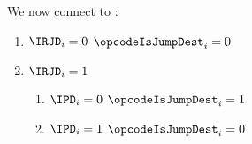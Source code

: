 We now connect \opcodeIsJumpDest{} to \IRJD{}:
\begin{enumerate}
    \item \If $\IRJD _{i} = 0$ \Then $\opcodeIsJumpDest _{i} = 0$
    \item \If $\IRJD _{i} = 1$ \Then
        \begin{enumerate}
            \item \If $\IPD _{i} = 0$ \Then $\opcodeIsJumpDest _{i} = 1$
            \item \If $\IPD _{i} = 1$ \Then $\opcodeIsJumpDest _{i} = 0$
        \end{enumerate}
\end{enumerate}

